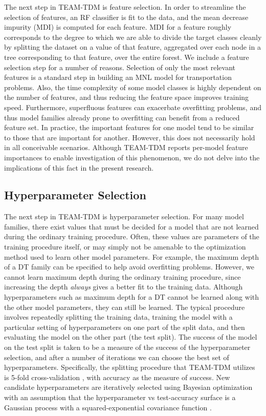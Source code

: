 \documentclass[numbered]{trbunofficial}
\begin{document}
The next step in TEAM-TDM is feature selection.
 In order to streamline the selection of features, an RF classifier is fit to the data, and the mean decrease impurity (MDI)  is computed for each feature.
 MDI for a feature roughly corresponds to the degree to which we are able to divide the target classes cleanly by splitting the dataset on a value of that feature, aggregated over each node in a tree corresponding to that feature, over the entire forest.
 We include a feature selection step for a number of reasons.
 Selection of only the most relevant features is a standard step in building an MNL model for transportation problems.
 Also, the time complexity of some model classes is highly dependent on the number of features, and thus reducing the feature space improves training speed.
 Furthermore, superfluous features can exacerbate overfitting problems, and thus model families already prone to overfitting can benefit from a reduced feature set.
 In practice, the important features for one model tend to be similar to those that are important for another.
 However, this does not necessarily hold in all conceivable scenarios.
 Although TEAM-TDM reports per-model feature importances to enable investigation of this phenomenon, we do not delve into the implications of this fact in the present research.

\subsection{Hyperparameter Selection} \label{subsection:hyperparameters}

The next step in TEAM-TDM is hyperparameter selection.
 For many model families, there exist values that must be decided for a model that are not learned during the ordinary training procedure.
 Often, these values are parameters of the training procedure itself, or may simply not be amenable to the optimization method used to learn other model parameters.
 For example, the maximum depth of a DT family can be specified to help avoid overfitting problems.
 However, we cannot learn maximum depth during the ordinary training procedure, since increasing the depth \emph{always} gives a better fit to the training data.
 Although hyperparameters such as maximum depth for a DT cannot be learned along with the other model parameters, they can still be learned.
 The typical procedure involves repeatedly splitting the training data, training the model with a particular setting of hyperparameters on one part of the split data, and then evaluating the model on the other part (the test split).
 The success of the model on the test split is taken to be a measure of the success of the hyperparameter selection, and after a number of iterations we can choose the best set of hyperparameters.
 Specifically, the splitting procedure that TEAM-TDM utilizes is 5-fold cross-validation , with accuracy as the measure of success.
 New candidate hyperparameters are iteratively selected using Bayesian optimization with an assumption that the hyperparameter vs test-accuracy surface is a Gaussian process with a squared-exponential covariance function .
 
\end{document}
